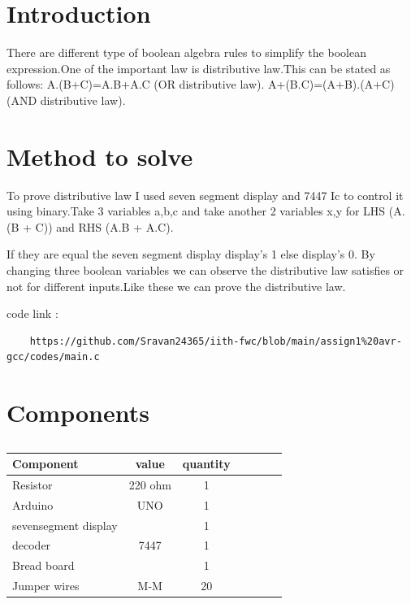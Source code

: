 \documentclass[10pt, a4paper]{article}
\title{\mytitle}
\author{\myauthor\hspace{1em}\\\contact\\IITH\hspace{0.5em}-\hspace{0.5em}\mymodule}
\date{}
\begin{document}
  \maketitle
\tableofcontents

\section{Introduction}

There are different type of boolean algebra rules to simplify the boolean expression.One of the important law is distributive law.This can be stated as follows:
         A.(B+C)=A.B+A.C (OR distributive law).
         A+(B.C)=(A+B).(A+C) (AND distributive law).


\section{Method to solve}


To prove distributive law I used seven segment display and 7447 Ic to control it using binary.Take 3 variables a,b,c and take another 2 variables x,y for LHS (A.(B + C)) and RHS (A.B + A.C). 

If they are equal the seven segment display display's 1 else display's 0. By changing three boolean variables we can observe the distributive law satisfies or not for different inputs.Like these we can prove the distributive law.

code link :
 \begin{lstlisting}
    https://github.com/Sravan24365/iith-fwc/blob/main/assign1%20avr-gcc/codes/main.c
\end{lstlisting}

\section{Components}

\begin{table}[htbp]
 \begin{center}
    \begin{tabular}{|l|c|c|c|c|c|c} \hline \textbf{Component}
  & \textbf{value} & \textbf{quantity} \\
 \hline
Resistor & 220 ohm & 1 \\ \hline
Arduino & UNO & 1 \\ \hline
sevensegment display &  & 1 \\ \hline
decoder & 7447 & 1  \\ \hline
Bread board &  & 1 \\ \hline
Jumper wires & M-M & 20\\ \hline
\end{tabular}   
\end{center}
\caption{\label{table:dummytable} }
\end{table}
\end{document}
